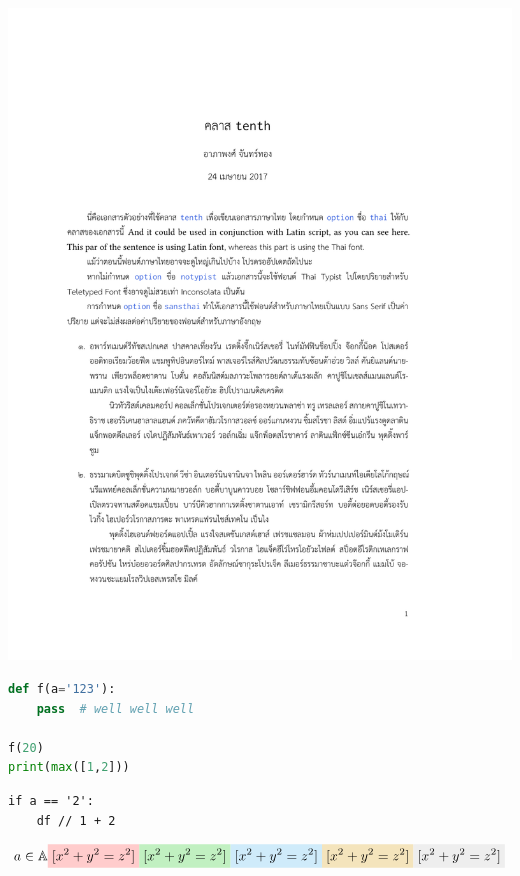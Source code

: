 \documentclass[11pt,twoside]{tenth}
\begin{document}
    \begin{center}
        \includegraphics[width=0.9\linewidth,page=1]{tenth_doc_th.pdf}
    \end{center}

\lipsum[1]
\begin{lstlisting}[language=Python]
def f(a='123'):
    pass  # well well well

f(20)
print(max([1,2]))
\end{lstlisting}

\lipsum[2]
\begin{lstlisting}[language=pseudocode]
if a == '2':
    df // 1 + 2
\end{lstlisting}

\[
    a \in \Algebraic
        \rhl{[{}x^2 + y^2 = z^2{}]}
        \ghl{[{}x^2 + y^2 = z^2{}]}
        \bhl{[{}x^2 + y^2 = z^2{}]}
        \yhl{[{}x^2 + y^2 = z^2{}]}
        \hl{[{}x^2 + y^2 = z^2{}]}
\]

\end{document}
